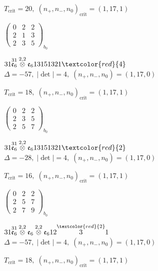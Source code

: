 \documentclass[10pt]{article}
\begin{document}
\hspace{1em}$T_{\text{crit}}=20,\; (n_+,n_-,n_0)_{\text{crit}}=(1,17,1)$

\hspace{2em}$\left(\begin{smallmatrix}0 & 2 & 2 \\ 2 & 1 & 3 \\ 2 & 3 & 5\end{smallmatrix}\right)_{\!b_0}$

\smallskip

$31\overset{31}{\mathfrak{e}_6}\overset{2,2}{\otimes}\mathfrak{e}_613151321\textcolor{red}{4}$ \quad $\Delta=-57,\; |\det|=4,\; (n_+,n_-,n_0)=(1,17,0)$

\hspace{1em}$T_{\text{crit}}=18,\; (n_+,n_-,n_0)_{\text{crit}}=(1,17,1)$

\hspace{2em}$\left(\begin{smallmatrix}0 & 2 & 2 \\ 2 & 3 & 5 \\ 2 & 5 & 7\end{smallmatrix}\right)_{\!b_0}$

$31\overset{31}{\mathfrak{e}_6}\overset{2,2}{\otimes}\mathfrak{e}_613151321\textcolor{red}{2}$ \quad $\Delta=-28,\; |\det|=4,\; (n_+,n_-,n_0)=(1,17,0)$

\hspace{1em}$T_{\text{crit}}=16,\; (n_+,n_-,n_0)_{\text{crit}}=(1,17,1)$

\hspace{2em}$\left(\begin{smallmatrix}0 & 2 & 2 \\ 2 & 5 & 7 \\ 2 & 7 & 9\end{smallmatrix}\right)_{\!b_0}$

\smallskip

$31\overset{31}{\mathfrak{e}_6}\overset{2,2}{\otimes}\mathfrak{e}_6\overset{2,2}{\otimes}\mathfrak{e}_612\overset{\textcolor{red}{2}}{3}1$ \quad $\Delta=-57,\; |\det|=4,\; (n_+,n_-,n_0)=(1,17,0)$

\hspace{1em}$T_{\text{crit}}=18,\; (n_+,n_-,n_0)_{\text{crit}}=(1,17,1)$
\end{document}
